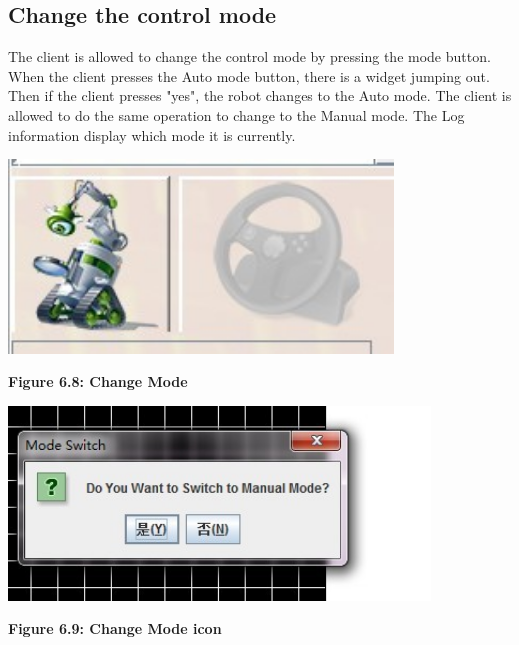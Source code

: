 \documentclass[11pt, a4paper]{report}
\begin{document}
\subsection{Change the control mode}
The client is allowed to change the control mode by pressing the mode button. When the client presses the Auto mode button, there is a widget jumping out. Then if the client presses "yes", the robot changes to the Auto mode. The client is allowed to do the same operation to change to the Manual mode.  The Log information display which mode it is currently.
\begin{center}
 \includegraphics[width=10.20cm]{ControlModeAuto.jpg}
\end{center}
\begin{center}
\textbf {Figure 6.8: Change Mode} \\[0.3cm]
\end{center}
\begin{center}
 \includegraphics[width=11.20cm]{ModeSwitch.jpg}
\end{center}
\begin{center}
\textbf {Figure 6.9: Change Mode icon} \\[0.3cm]
\end{center}
\end{document}
